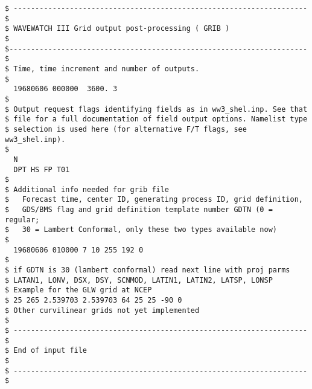 \begin{footnotesize}
\begin{verbatim}
$ -------------------------------------------------------------------- $
$ WAVEWATCH III Grid output post-processing ( GRIB )                   $
$--------------------------------------------------------------------- $
$ Time, time increment and number of outputs.
$
  19680606 000000  3600. 3
$
$ Output request flags identifying fields as in ww3_shel.inp. See that
$ file for a full documentation of field output options. Namelist type
$ selection is used here (for alternative F/T flags, see ww3_shel.inp).
$
  N
  DPT HS FP T01
$
$ Additional info needed for grib file
$   Forecast time, center ID, generating process ID, grid definition,
$   GDS/BMS flag and grid definition template number GDTN (0 = regular;
$   30 = Lambert Conformal, only these two types available now) 
$
  19680606 010000 7 10 255 192 0
$
$ if GDTN is 30 (lambert conformal) read next line with proj parms 
$ LATAN1, LONV, DSX, DSY, SCNMOD, LATIN1, LATIN2, LATSP, LONSP   
$ Example for the GLW grid at NCEP 
$ 25 265 2.539703 2.539703 64 25 25 -90 0 
$ Other curvilinear grids not yet implemented 
$
$ -------------------------------------------------------------------- $
$ End of input file                                                    $
$ -------------------------------------------------------------------- $
\end{verbatim}
\end{footnotesize}
